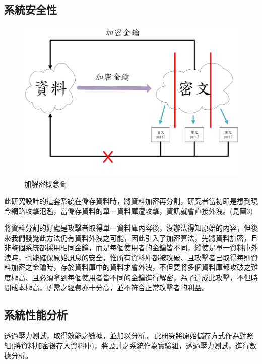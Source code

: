 \documentclass[11pt,twocolumn]{article}
\begin{document}
\subsection{系統安全性}
\begin{figure}[h]
\centering
\includegraphics[scale=0.3]{Fig.3.png}
\caption{加解密概念圖}
\end{figure}

此研究設計的這套系統在儲存資料時，將資料加密再分割，研究者當初即是想到現今網路攻擊氾濫，當儲存資料的單一資料庫遭攻擊，資訊就會直接外洩。(見圖3)\par
將資料分割的好處是攻擊者取得單一資料庫內容後，沒辦法得知原始的內容，但後來我們發覺此方法仍有資料外洩之可能，因此引入了加密算法，先將資料加密，且非整個系統都採用相同金鑰，而是每個使用者的金鑰皆不同，縱使是單一資料庫外洩時，也能確保原始訊息的安全，惟所有資料庫都被攻破、且攻擊者已取得每則資料加密之金鑰時，存於資料庫中的資料才會外洩，不但要將多個資料庫都攻破之難度極高、且必須拿到每個使用者皆不同的金鑰進行解密，為了達成此攻擊，不但時間成本極高，所需之經費亦十分高，並不符合正常攻擊者的利益。

\subsection{系統性能分析}

透過壓力測試，取得效能之數據，並加以分析。
此研究將原始儲存方式作為對照組(將資料加密後存入資料庫)，將設計之系統作為實驗組，透過壓力測試，進行數據分析。
\end{document}
